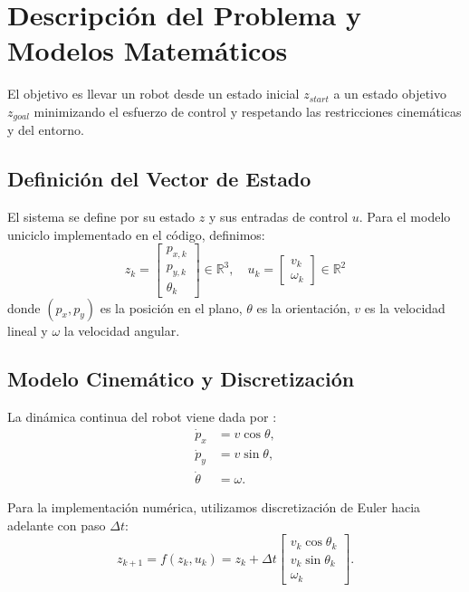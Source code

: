 \documentclass[conference]{IEEEtran}
\begin{document}
\section{Descripción del Problema y Modelos Matemáticos}

El objetivo es llevar un robot desde un estado inicial $z_{start}$ a un estado objetivo $z_{goal}$ minimizando el esfuerzo de control y respetando las restricciones cinemáticas y del entorno.

\subsection{Definición del Vector de Estado}
El sistema se define por su estado $z$ y sus entradas de control $u$. Para el modelo uniciclo implementado en el código, definimos:
\begin{equation}
    z_k = \begin{bmatrix} p_{x,k} \\ p_{y,k} \\ \theta_k \end{bmatrix} \in \mathbb{R}^3, \quad
    u_k = \begin{bmatrix} v_k \\ \omega_k \end{bmatrix} \in \mathbb{R}^2
\end{equation}
donde $(p_x, p_y)$ es la posición en el plano, $\theta$ es la orientación, $v$ es la velocidad lineal y $\omega$ la velocidad angular.

\subsection{Modelo Cinemático y Discretización}
La dinámica continua del robot viene dada por \cite{siegwart}:
\begin{align}
\dot p_x &= v \cos\theta, \\
\dot p_y &= v \sin\theta, \\
\dot\theta &= \omega.
\end{align}

Para la implementación numérica, utilizamos discretización de Euler hacia adelante con paso $\Delta t$:
\begin{equation}
z_{k+1} = f(z_k, u_k) = z_k + \Delta t \begin{bmatrix} v_k \cos\theta_k \\ v_k \sin\theta_k \\ \omega_k \end{bmatrix}.
\end{equation}
\end{document}
